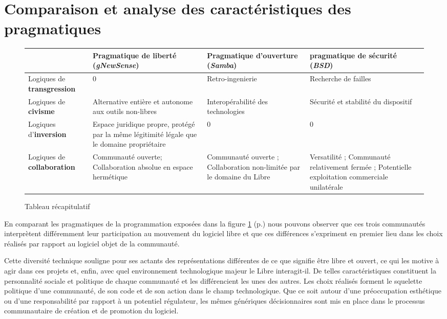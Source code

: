 \section{Comparaison et analyse des caractéristiques des pragmatiques}\label{3.4}

\begin{figure}[hbt]
\caption{Tableau récapitulatif} \label{fig3.1}
\begin{tabular}{|L{3cm}|L{3.5cm}|L{3.5cm}|L{3.5cm}|}
\hline
 & Pragmatique de \textbf{liberté} (\emph{gNewSense}) & Pragmatique d'\textbf{ouverture} (\emph{Samba}) & pragmatique de \textbf{sécurité} (\emph{BSD}) \\
\hline
Logiques de \textbf{transgression} & 0 & Retro-ingenierie & Recherche de failles \\
\hline
Logiques de \textbf{civisme} & Alternative entière et autonome aux outils non-libres & Interopérabilité des technologies & Sécurité et stabilité du dispositif \\
\hline
Logiques d'\textbf{inversion} & Espace juridique propre, protégé par la même légitimité légale que le domaine propriétaire & 0 & 0 \\
\hline
Logiques de \textbf{collaboration} & Communauté ouverte; Collaboration absolue en espace hermétique & Communauté ouverte ; Collaboration non-limitée par le domaine du Libre & Versatilité ; Communauté relativement fermée ; Potentielle exploitation commerciale unilatérale \\
\hline
\end{tabular}
\end{figure}

En comparant les pragmatiques de la programmation exposées dans la figure \ref{fig3.1} (p.\pageref{fig3.1}) nous pouvons observer que ces trois communautés interprètent différemment leur participation au mouvement du logiciel libre et que ces différences s'expriment en premier lieu dans les choix réalisés par rapport au logiciel objet de la communauté.

Cette diversité technique souligne pour ses actants des représentations différentes de ce que signifie être libre et ouvert, ce qui les motive à agir dans ces projets et, enfin, avec quel environnement technologique majeur le Libre interagit-il. De telles caractéristiques constituent la personnalité sociale et politique de chaque communauté et les différencient les unes des autres. Les choix réalisés forment le squelette politique d'une communauté, de son code et de son action dans le champ technologique. Que ce soit autour d'une préoccupation esthétique ou d'une responsabilité par rapport à un potentiel régulateur, les mêmes génériques décisionnaires sont mis en place dans le processus communautaire de création et de promotion du logiciel.

